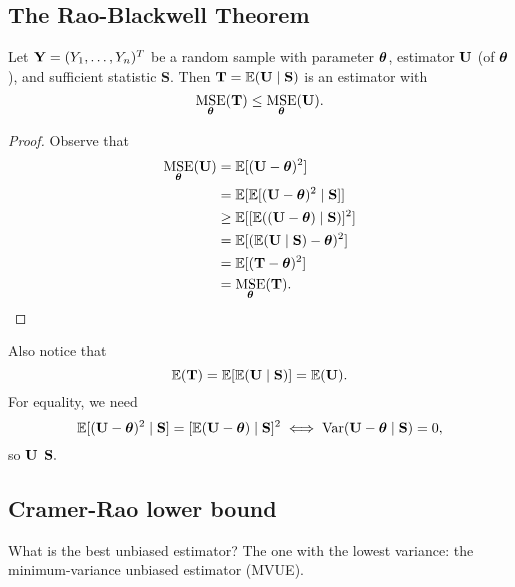 
\subsection{The Rao-Blackwell Theorem}

\begin{theorem}
Let $\YY=(Y_1,\ldots, Y_n)^T$ be a random sample with parameter $\boldsymbol \btheta$, estimator $\UU$ (of $\btheta$), and sufficient statistic $\mathbf S$. Then $\mathbf T=\EE(\UU\mid \bS)$ is an estimator with
$$
\MSE_{\btheta}(\bT)\leq \MSE_\btheta(\UU).
$$
\end{theorem}

\begin{proof}
Observe that
\begin{align*}
		\MSE_\btheta(\UU)&=\EE[(\UU-\btheta)^2] \\
    &=\EE[\EE[(\UU-\btheta)^2\mid \bS]] \\
    &\geq \EE[[\EE((\UU-\btheta)\mid \bS)]^2] \\
    &=\EE[(\EE(\UU\mid \bS)-\btheta)^2] \\
    &=\EE[(\bT-\btheta)^2] \\
    &=\MSE_\btheta(\bT).
\end{align*}
\end{proof}
Also notice that 
$$\EE(\bT)=\EE[\EE(\UU\mid\bS)]=\EE(\UU).$$
For equality, we need
$$
\EE[(\UU-\btheta)^2\mid \bS]=[\EE(\UU-\btheta)\mid \bS]^2 \iff \Var(\UU-\btheta \mid \bS)=0,
$$
so $\UU$  $\bS.$ 

\subsection{Cramer-Rao lower bound}

What is the best unbiased estimator? The one with the lowest variance: the minimum-variance unbiased estimator (MVUE).

